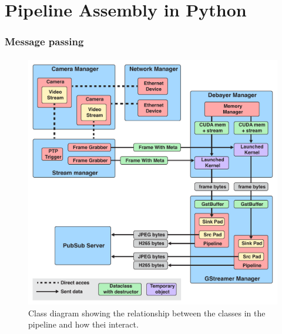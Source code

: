 
\chapter{Pipeline Assembly in Python}
\label{chap:pipeline}
\subsection{Message passing}
\subsubsection{}


\begin{figure}[H]
    \centering
    \includegraphics[width=\textwidth]{figures/object_overview.pdf}
    \caption{Class diagram showing the relationship between the classes in the pipeline and how thei interact.}
    \label{fig:pipeline_current}
\end{figure}
